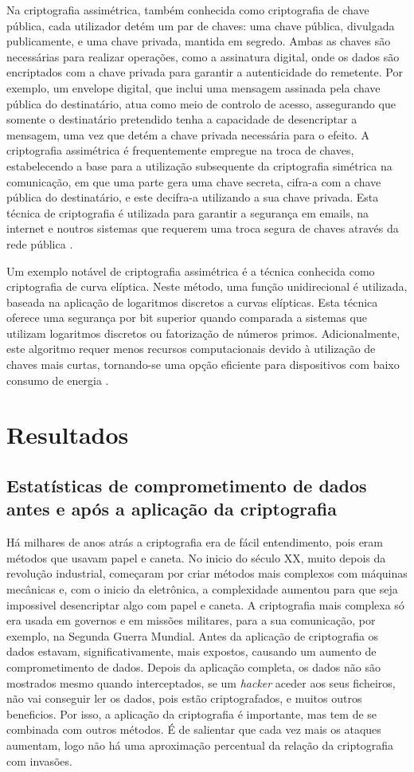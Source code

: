 \documentclass{report}
\begin{document}
Na criptografia assimétrica, também conhecida como criptografia de chave pública, cada utilizador detém um par de chaves: uma chave pública, divulgada publicamente, e uma chave privada, mantida em segredo. Ambas as chaves são necessárias para realizar operações, como a assinatura digital, onde os dados são encriptados com a chave privada para garantir a autenticidade do remetente. Por exemplo, um envelope digital, que inclui uma mensagem assinada pela chave pública do destinatário, atua como meio de controlo de acesso, assegurando que somente o destinatário pretendido tenha a capacidade de desencriptar a mensagem, uma vez que detém a chave privada necessária para o efeito. A criptografia assimétrica é frequentemente empregue na troca de chaves, estabelecendo a base para a utilização subsequente da criptografia simétrica na comunicação, em que uma parte gera uma chave secreta, cifra-a com a chave pública do destinatário, e este decifra-a utilizando a sua chave privada. Esta técnica de criptografia é utilizada para garantir a segurança em emails, na internet e noutros sistemas que requerem uma troca segura de chaves através da rede pública \cite{Johnson.20}.

Um exemplo notável de criptografia assimétrica é a técnica conhecida como criptografia de curva elíptica. Neste método, uma função unidirecional é utilizada, baseada na aplicação de logaritmos discretos a curvas elípticas. Esta técnica oferece uma segurança por bit superior quando comparada a sistemas que utilizam logaritmos discretos ou fatorização de números primos. Adicionalmente, este algoritmo requer menos recursos computacionais devido à utilização de chaves mais curtas, tornando-se uma opção eficiente para dispositivos com baixo consumo de energia \cite{Conrad.17}.
 

\chapter{Resultados}
\section{Estatísticas de comprometimento de dados antes e após a aplicação da criptografia}
Há milhares de anos atrás a criptografia era de fácil entendimento, pois eram métodos que usavam papel e caneta. No inicio do século XX, muito depois da revolução industrial, começaram por criar métodos mais complexos com máquinas mecânicas e, com o inicio da eletrônica, a complexidade aumentou para que seja impossivel desencriptar algo com papel e caneta. A criptografia mais complexa só era usada em governos e em missões militares, para a sua comunicação, por exemplo, na Segunda Guerra Mundial.
	Antes da aplicação de criptografia os dados estavam, significativamente, mais expostos, causando um aumento de comprometimento de dados. Depois da aplicação completa, os dados não são mostrados mesmo quando interceptados, se um \textit{hacker} aceder aos seus ficheiros, não vai conseguir ler os dados, pois estão criptografados, e muitos outros beneficios. Por isso, a aplicação da criptografia é importante, mas tem de se combinada com outros métodos. É de salientar que cada vez mais os ataques aumentam, logo não há uma aproximação percentual da relação da criptografia com invasões.\cite{stats}
\end{document}
